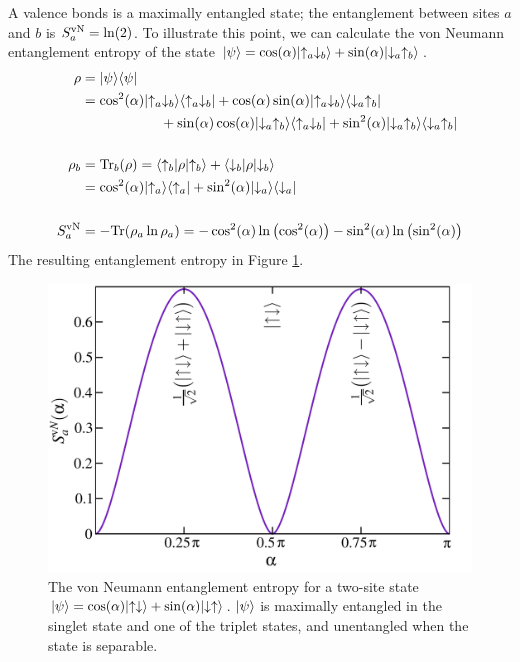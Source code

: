 A valence bonds is a maximally entangled state; the entanglement between sites $a$ and $b$ is $S^{\rm vN}_a = \ln(2)$.  To illustrate this point, we can calculate the von Neumann entanglement entropy of the state 
$\lvert {\psi} \rangle=\cos(\alpha)\lvert {\uparrow_a \downarrow_b} \rangle + \sin(\alpha)\lvert {\downarrow_a \uparrow_b} \rangle $.
\begin{align}
\rho &= \lvert {\psi} \rangle\langle {\psi} \rvert \\
&= \cos^2(\alpha)\lvert {\uparrow_a \downarrow_b} \rangle\langle {\uparrow_a \downarrow_b} \rvert + \nonumber
	\cos(\alpha)\sin(\alpha)\lvert {\uparrow_a \downarrow_b} \rangle\langle {\downarrow_a \uparrow_b} \rvert  \\ 
	& \hspace{2cm}+\sin(\alpha)\cos(\alpha)\lvert {\downarrow_a \uparrow_b} \rangle\langle {\uparrow_a \downarrow_b} \rvert + 
	\sin^2(\alpha)\lvert {\downarrow_a \uparrow_b} \rangle\langle {\downarrow_a \uparrow_b} \rvert \\ \nonumber \\ 
\rho_b &={\rm Tr}_b(\rho) = \langle {\uparrow_b} \rvert \rho \lvert {\uparrow_b} \rangle +  \langle {\downarrow_b} \rvert \rho \lvert {\downarrow_b} \rangle  \\
	&= \cos^2(\alpha)\lvert {\uparrow_a} \rangle\langle {\uparrow_a} \rvert + 
	\sin^2(\alpha)\lvert {\downarrow_a} \rangle\langle {\downarrow_a} \rvert \\ \nonumber \\ 
S^{\rm vN}_a &= -{\rm Tr}(\rho_a \ln \rho_a) = -  \cos^2(\alpha) \ln \left( \cos^2(\alpha) \right)
			 -  \sin^2(\alpha) \ln \left( \sin^2(\alpha) \right)
\end{align}
The resulting entanglement entropy in Figure \ref{tent}.
\begin{figure}
	\centering
	 \includegraphics[width=5in]{./figures/made/tent.pdf}
	 \caption[von Neumann entanglement entropy for a two-site state]{
	 	The von Neumann entanglement entropy for a two-site state
		$\lvert {\psi} \rangle=\cos(\alpha)\lvert {\uparrow\downarrow} \rangle + \sin(\alpha)\lvert {\downarrow\uparrow} \rangle$.
		$\lvert {\psi} \rangle$ is maximally entangled in the singlet state and one of the triplet states, 
		and unentangled when the state is separable.
	 }
	 \label{tent}
\end{figure}


